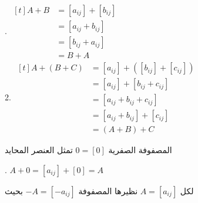 . $
\begin{aligned}[t]
	A + B &= [a_{ij}] + [b_{ij}]\\
	&= [a_{ij} + b_{ij}]\\
	&= [b_{ij} + a_{ij}]\\
	&= B+A
\end{aligned}
$\\
2. $
\begin{aligned}[t]
	A + (B+C) &= [a_{ij}] + ([b_{ij}] + [c_{ij}])\\
	&= [a_{ij}] + [b_{ij} + c_{ij}]\\
	&= [a_{ij} + b_{ij} + c_{ij}]\\
	&= [a_{ij} + b_{ij}] + [c_{ij}]\\
	&= (A+B)+C
\end{aligned}
$

\noindent
المصفوفة الصفرية $0=[0]$ تمثل العنصر المحايد

. $A+0 = [a_{ij}] + [0] = A$

\noindent
لكل $A=[a_{ij}]$ نظيرها المصفوفة $-A=[-a_{ij}]$ بحيث 

